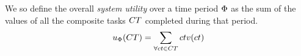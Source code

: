 We so define the overall \textit{system utility} over a time period $\Phi$ as the sum of the values of all the composite tasks $\setCompositeTask{}{}$ completed during that period.
	\begin{equation}
		\label{eq:system_utility}
		\functionSystemUtility{}{} = \sum_{\forall \varCompositeTask{}{} \in \setCompositeTask{}{}}
		\functionCompositeTaskValue{}{}
	\end{equation}